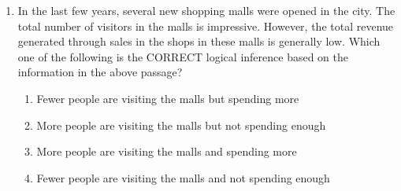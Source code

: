 \documentclass[a4paper,10pt]{article}
\begin{document}
\begin{enumerate}
\begin{enumerate}
\end{enumerate}

\item In the last few years, several new shopping malls were opened in the city. The total number of visitors in the malls is impressive. However, the total revenue generated through sales in the shops in these malls is generally low.
Which one of the following is the CORRECT logical inference based on the information in the above passage?

\hfill{}
\begin{enumerate}
	\item Fewer people are visiting the malls but spending more
	\item More people are visiting the malls but not spending enough
	\item More people are visiting the malls and spending more
	\item Fewer people are visiting the malls and not spending enough
\end{enumerate}


\end{enumerate}
\end{document}
